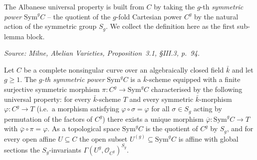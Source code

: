 The Albanese universal property is built from \(C\) by taking the
\(g\)-th \emph{symmetric power} \(\mathrm{Sym}^g C\) -- the quotient of the
\(g\)-fold Cartesian power \(C^g\) by the natural action of the symmetric group
\(S_g\). We collect the definition here as the first sub-lemma block.

\begin{definition}
  \label{def:symmetric_power_curve}
  \textit{Source: Milne, \emph{Abelian Varieties}, Proposition~3.1, \S III.3, p.~94.}

  Let \(C\) be a complete nonsingular curve over an algebraically closed field
  \(\bar k\) and let \(g \ge 1\). The \emph{\(g\)-th symmetric power}
  \(\mathrm{Sym}^g C\) is a \(\bar k\)-scheme equipped with a finite surjective
  symmetric morphism \(\pi \colon C^g \to \mathrm{Sym}^g C\) characterised by
  the following universal property: for every \(\bar k\)-scheme \(T\) and every
  symmetric \(\bar k\)-morphism \(\varphi \colon C^g \to T\) (i.e.\ a morphism
  satisfying \(\varphi \circ \sigma = \varphi\) for all \(\sigma \in S_g\)
  acting by permutation of the factors of \(C^g\)) there exists a unique
  morphism \(\overline\varphi \colon \mathrm{Sym}^g C \to T\) with
  \(\overline\varphi \circ \pi = \varphi\). As a topological space
  \(\mathrm{Sym}^g C\) is the quotient of \(C^g\) by \(S_g\), and for every open
  affine \(U \subseteq C\) the open subset \(U^{(g)} \subseteq \mathrm{Sym}^g
  C\) is affine with global sections the \(S_g\)-invariants
  \(\Gamma(U^g, \mathcal O_{C^g})^{S_g}\).
\end{definition}

